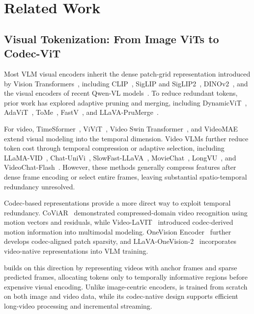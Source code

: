 \section{Related Work}
\label{sec:related}

\subsection{Visual Tokenization: From Image ViTs to Codec-ViT}
\label{sec:related_tokenization}

Most VLM visual encoders inherit the dense patch-grid representation introduced by Vision Transformers~\citep{dosovitskiy2021vit}, including CLIP~\citep{radford2021clip}, SigLIP and SigLIP2~\citep{zhai2023siglip,tschannen2025siglip}, DINOv2~\citep{oquab2024dinov2}, and the visual encoders of recent Qwen-VL models~\citep{bai2025qwen25vl,qwen3vl}. To reduce redundant tokens, prior work has explored adaptive pruning and merging, including DynamicViT~\citep{rao2021dynamicvit}, AdaViT~\citep{meng2022adavit}, ToMe~\citep{bolya2023tome}, FastV~\citep{chen2024fastv}, and LLaVA-PruMerge~\citep{shang2024prumerge}.

For video, TimeSformer~\citep{bertasius2021timesformer}, ViViT~\citep{arnab2021vivit}, Video Swin Transformer~\citep{liu2022videoswin}, and VideoMAE~\citep{tong2022videomae} extend visual modeling into the temporal dimension. Video VLMs further reduce token cost through temporal compression or adaptive selection, including LLaMA-VID~\citep{li2023llamavid}, Chat-UniVi~\citep{jin2024chatunivi}, SlowFast-LLaVA~\citep{xu2024slowfastllava}, MovieChat~\citep{song2024moviechat}, LongVU~\citep{shen2024longvu}, and VideoChat-Flash~\citep{videochatflash2025}. However, these methods generally compress features after dense frame encoding or select entire frames, leaving substantial spatio-temporal redundancy unresolved.

Codec-based representations provide a more direct way to exploit temporal redundancy. CoViAR~\citep{wu2018coviar} demonstrated compressed-domain video recognition using motion vectors and residuals, while Video-LaVIT~\citep{videolavit2024} introduced codec-derived motion information into multimodal modeling. OneVision Encoder~\citep{ovencoder2026} further develops codec-aligned patch sparsity, and LLaVA-OneVision-2~\citep{llavaonevision2} incorporates video-native representations into VLM training.

\magevit builds on this direction by representing videos with anchor frames and sparse predicted frames, allocating tokens only to temporally informative regions before expensive visual encoding. Unlike image-centric encoders, \magevit is trained from scratch on both image and video data, while its codec-native design supports efficient long-video processing and incremental streaming.

